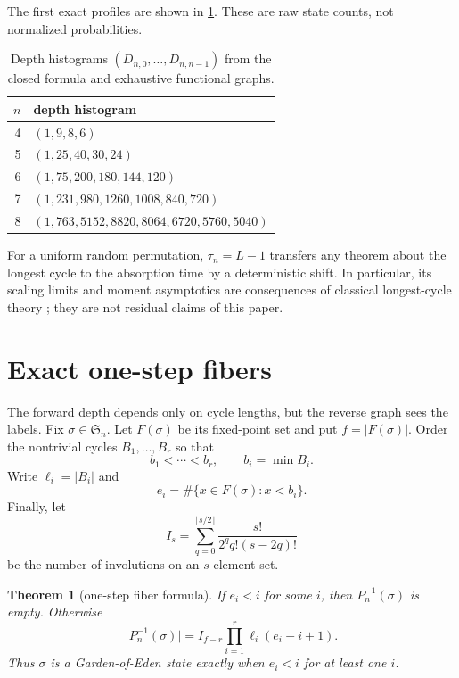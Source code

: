 \documentclass[11pt,a4paper]{amsart}
\newtheorem{theorem}{Theorem}[section]
\theoremstyle{definition}
\theoremstyle{remark}
\newcommand{\Sn}{\mathfrak S_n}
\newcommand{\card}[1]{\lvert #1\rvert}
\begin{document}
The first exact profiles are shown in \cref{tab:profiles}.  These are raw
state counts, not normalized probabilities.
\begin{table}[ht]
\centering
\caption{Depth histograms $(D_{n,0},\ldots,D_{n,n-1})$ from the closed
formula and exhaustive functional graphs.}
\label{tab:profiles}
\small
\begin{tabular}{rl}
\toprule
$n$ & depth histogram \\
\midrule
4 & $(1,9,8,6)$ \\
5 & $(1,25,40,30,24)$ \\
6 & $(1,75,200,180,144,120)$ \\
7 & $(1,231,980,1260,1008,840,720)$ \\
8 & $(1,763,5152,8820,8064,6720,5760,5040)$ \\
\bottomrule
\end{tabular}
\end{table}

For a uniform random permutation, $\tau_n=L-1$ transfers any theorem about
the longest cycle to the absorption time by a deterministic shift.  In
particular, its scaling limits and moment asymptotics are consequences of
classical longest-cycle theory \cite{SheppLloyd1966}; they are not residual
claims of this paper.

\section{Exact one-step fibers}\label{sec:fibers}

The forward depth depends only on cycle lengths, but the reverse graph sees
the labels.  Fix $\sigma\in\Sn$.  Let $F(\sigma)$ be its fixed-point set and
put $f=\card{F(\sigma)}$.  Order the nontrivial cycles
$B_1,\ldots,B_r$ so that
\[
 b_1<\cdots<b_r,
 \qquad b_i=\min B_i.
\]
Write $\ell_i=\card{B_i}$ and
\[
 e_i=\#\{x\in F(\sigma):x<b_i\}.
\]
Finally, let
\begin{equation}\label{eq:involution}
 I_s=\sum_{q=0}^{\lfloor s/2\rfloor}
 \frac{s!}{2^q q!(s-2q)!}
\end{equation}
be the number of involutions on an $s$-element set.

\begin{theorem}[one-step fiber formula]\label{thm:fiber}
If $e_i<i$ for some $i$, then $P_n^{-1}(\sigma)$ is empty.  Otherwise
\begin{equation}\label{eq:fiber}
 \boxed{
 \card{P_n^{-1}(\sigma)}
 =I_{f-r}\prod_{i=1}^r \ell_i(e_i-i+1).}
\end{equation}
Thus $\sigma$ is a Garden-of-Eden state exactly when
$e_i<i$ for at least one $i$.
\end{theorem}
\end{document}
